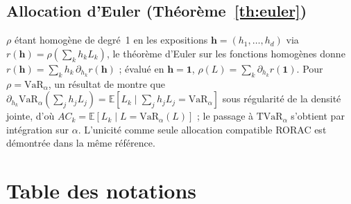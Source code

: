 \documentclass[11pt,a4paper]{article}
\theoremstyle{navystyle}
\theoremstyle{navydef}
\newcommand{\E}{\mathbb{E}}
\newcommand{\VaR}{\mathrm{VaR}}
\newcommand{\TVaR}{\mathrm{TVaR}}
\begin{document}
\subsection{Allocation d'Euler (Théorème~\ref{th:euler})}
\label{ann:euler}
$\rho$ étant homogène de degré~1 en les expositions $\mathbf h=(h_1,\dots,h_d)$ via $r(\mathbf h)=\rho(\sum_k h_k L_k)$, le théorème d'Euler sur les fonctions homogènes donne $r(\mathbf h)=\sum_k h_k\,\partial_{h_k} r(\mathbf h)$ ; évalué en $\mathbf h=\mathbf 1$, $\rho(L)=\sum_k \partial_{h_k}r(\mathbf 1)$. Pour $\rho=\VaR_\alpha$, un résultat de \citet{tasche1999} montre que $\partial_{h_k}\VaR_\alpha(\sum_j h_j L_j)=\E[L_k\mid \sum_j h_j L_j=\VaR_\alpha]$ sous régularité de la densité jointe, d'où $AC_k=\E[L_k\mid L=\VaR_\alpha(L)]$ ; le passage à $\TVaR_\alpha$ s'obtient par intégration sur $\alpha$. L'unicité comme seule allocation compatible RORAC est démontrée dans la même référence.

\clearpage
\section{Table des notations}
\label{ann:notations}
\end{document}
